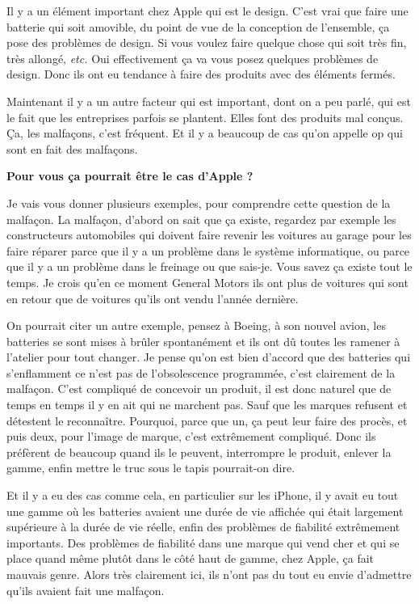 \begin{small}
Il y a un élément important chez Apple qui est le design. C'est vrai que faire une batterie qui soit amovible, du point de vue de la conception de l'ensemble, ça pose des problèmes de design. Si vous voulez faire quelque chose qui soit très fin, très allongé, \textit{etc.} Oui effectivement ça va vous posez quelques problèmes de design. Donc ils ont eu tendance à faire des produits avec des éléments fermés.

Maintenant il y a un autre facteur qui est important, dont on a peu parlé, qui est le fait que les entreprises parfois se plantent. Elles font des produits mal conçus. Ça, les malfaçons, c'est fréquent. Et il y a beaucoup de cas qu'on appelle op qui sont en fait des malfaçons.

\textbf{Pour vous ça pourrait être le cas d'Apple ?}
\smallbreak


Je vais vous donner plusieurs exemples, pour comprendre cette question de la malfaçon. La malfaçon, d'abord on sait que ça existe, regardez par exemple les constructeurs automobiles qui doivent faire revenir les voitures au garage pour les faire réparer parce que il y a un problème dans le système informatique, ou parce que il y a un problème dans le freinage ou que sais-je. Vous savez ça existe tout le temps. Je crois qu'en ce moment General Motors ils ont plus de voitures qui sont en retour que de voitures qu'ils ont vendu l'année dernière. 

On pourrait citer un autre exemple, pensez à Boeing, à son nouvel avion, les batteries se sont mises à brûler spontanément et ils ont dû toutes les ramener à l'atelier pour tout changer. Je pense qu'on est bien d'accord que des batteries qui s'enflamment ce n'est pas de l'obsolescence programmée, c'est clairement de la malfaçon. C'est compliqué de concevoir un produit, il est donc naturel que de temps en temps il y en ait qui ne marchent pas. Sauf que les marques refusent et détestent le reconnaître. Pourquoi, parce que un, ça peut leur faire des procès, et puis deux, pour l'image de marque, c'est extrêmement compliqué. Donc ils préfèrent de beaucoup quand ils le peuvent, interrompre le produit, enlever la gamme, enfin \og mettre le truc sous le tapis\fg{} pourrait-on dire. 

Et il y a eu des cas comme cela, en particulier sur les iPhone, il y avait eu tout une gamme où les batteries avaient une durée de vie affichée qui était largement supérieure à la durée de vie réelle, enfin des problèmes de fiabilité extrêmement importants. Des problèmes de fiabilité dans une marque qui vend cher et qui se place quand même plutôt dans le côté haut de gamme, chez Apple, ça fait mauvais genre. Alors très clairement ici, ils n'ont pas du tout eu envie d'admettre qu'ils avaient fait une malfaçon.


\end{small}
